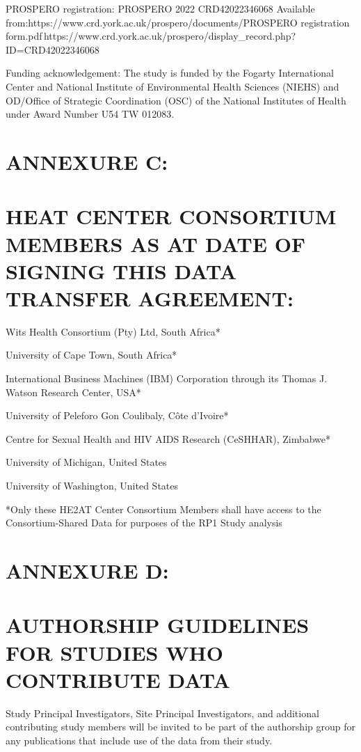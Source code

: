 \documentclass[12pt,letterpaper]{article}
\begin{document}
PROSPERO registration: PROSPERO 2022 CRD42022346068 Available from:https://www.crd.york.ac.uk/prospero/documents/PROSPERO registration form.pdf https://www.crd.york.ac.uk/prospero/display\_record.php?ID=CRD42022346068

Funding acknowledgement: The study is funded by the Fogarty International Center and National Institute of Environmental Health Sciences (NIEHS) and OD/Office of Strategic Coordination (OSC) of the National Institutes of Health under Award Number U54 TW 012083.

\section*{ANNEXURE C:}

\section*{HEAT CENTER CONSORTIUM MEMBERS AS AT DATE OF SIGNING THIS DATA TRANSFER AGREEMENT:}

Wits Health Consortium (Pty) Ltd, South Africa*

University of Cape Town, South Africa*

International Business Machines (IBM) Corporation through its Thomas J. Watson Research Center, USA*

University of Peleforo Gon Coulibaly, Côte d’Ivoire*

Centre for Sexual Health and HIV AIDS Research (CeSHHAR), Zimbabwe*

University of Michigan, United States

University of Washington, United States

*Only these HE2AT Center Consortium Members shall have access to the Consortium-Shared Data for purposes of the RP1 Study analysis

\section*{ANNEXURE D:}

\section*{AUTHORSHIP GUIDELINES FOR STUDIES WHO CONTRIBUTE DATA}

Study Principal Investigators, Site Principal Investigators, and additional contributing study members will be invited to be part of the authorship group for any publications that include use of the data from their study.
\end{document}
